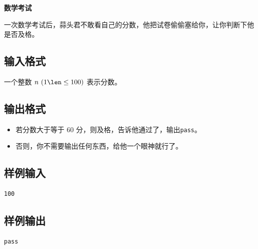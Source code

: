 \documentclass{article}
\newcommand{\problemname}[1]{\begin{center}\Large\bfseries #1\end{center}}
\begin{document}
\problemname{数学考试}

一次数学考试后，蒜头君不敢看自己的分数，他把试卷偷偷塞给你，让你判断下他是否及格。

\subsection*{输入格式}
一个整数 $n\text{ }(1\len\le100)$ 表示分数。

\subsection*{输出格式}
\begin{itemize}
  \item 若分数大于等于 $60$ 分，则及格，告诉他通过了，输出\texttt{pass}。

  \item 否则，你不需要输出任何东西，给他一个眼神就行了。

\end{itemize}
\subsection*{样例输入}
\begin{verbatim}
100
\end{verbatim}

\subsection*{样例输出}
\begin{verbatim}
pass
\end{verbatim}
\end{document}
